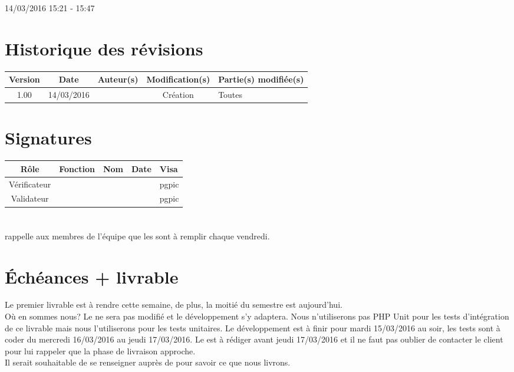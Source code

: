 \documentclass [a4paper] {article}
\begin{document}
14/03/2016			 				%
\hfill   
\hfill 	 15:21 - 15:47 				%



\section*{Historique des révisions}
\begin{center}
			\begin{tabular}{| c | c | c | c | p{4cm} |}
				\hline
				\rowcolor{Gray}
				Version & Date & Auteur(s) & Modification(s) & Partie(s) modifiée(s)		 \\
				\hline
				1.00 & 14/03/2016 & \Pierre & Création & Toutes \\
		\hline		
			\end{tabular}
		\end{center}

\section*{Signatures}

		\begin{center}
			\begin{tabular}{| c | c | c | c | p{4cm} |}
				\hline
				\rowcolor{Gray}
				Rôle & Fonction & Nom & Date & Visa		 \\
				\hline
				Vérificateur & \RQA & \Kafui &  & pgpic \\[30pt]
				\hline
				Validateur & \CP & \Sergi &  & pgpic \\[30pt]	
				\hline
			\end{tabular}
		\end{center}
		
\newpage		



\section{\FS}
\Sergi{} rappelle aux membres de l'équipe que les \FS{} sont à remplir chaque vendredi.

\section{Échéances + livrable}
Le premier livrable est à rendre cette semaine, de plus, la moitié du semestre est aujourd'hui. \\
Où en sommes nous? Le \PTI{} ne sera pas modifié et le développement s'y adaptera. Nous n'utiliserons pas PHP Unit pour les tests d'intégration de ce livrable mais nous l'utiliserons pour les tests unitaires. 
Le développement est à finir pour mardi 15/03/2016 au soir, les tests sont à coder du mercredi 16/03/2016 au jeudi 17/03/2016. Le \CDR{} est à rédiger avant jeudi 17/03/2016 et il ne faut pas oublier de contacter le client pour lui rappeler que la phase de livraison approche. \\
Il serait souhaitable de se renseigner auprès de \nomTuteurPedago{} pour savoir ce que nous livrons.
\end{document}
